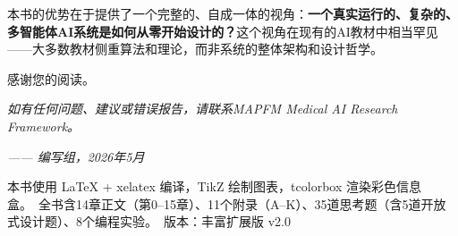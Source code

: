 \documentclass[11pt,a4paper]{ctexart}
\begin{document}
本书的优势在于提供了一个完整的、自成一体的视角：\textbf{一个真实运行的、复杂的、多智能体AI系统是如何从零开始设计的？}这个视角在现有的AI教材中相当罕见——大多数教材侧重算法和理论，而非系统的整体架构和设计哲学。

\vspace{1cm}

\begin{center}
{\large 感谢您的阅读。}

\vspace{0.5cm}

\textit{如有任何问题、建议或错误报告，请联系MAPFM Medical AI Research Framework。}

\vspace{0.5cm}

\textit{—— 编写组，2026年5月}

\vspace{1cm}

{\small 本书使用 \LaTeX{} + xelatex 编译，TikZ 绘制图表，tcolorbox 渲染彩色信息盒。\
全书含14章正文（第0--15章）、11个附录（A--K）、35道思考题（含5道开放式设计题）、8个编程实验。\
版本：丰富扩展版 v2.0}
\end{center}
\end{document}
